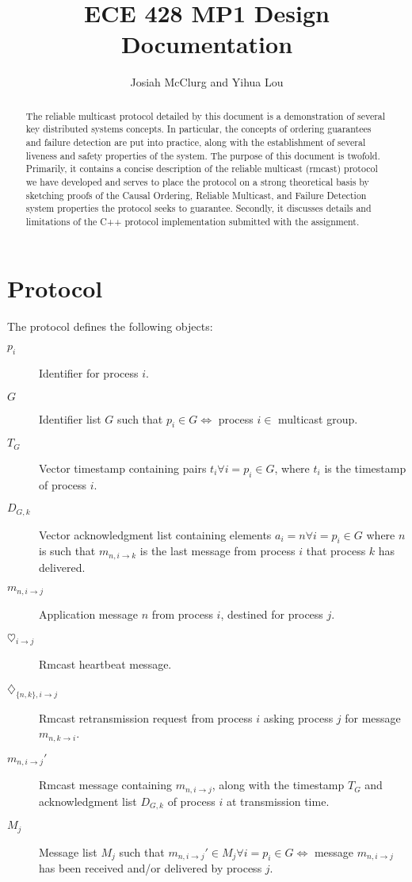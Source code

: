 \documentclass[conference]{IEEEtran}
\title{ECE 428 MP1 Design Documentation}
\author{Josiah McClurg and Yihua Lou}
\begin{document}
\maketitle

\begin{abstract}
The reliable multicast protocol detailed by this document is a demonstration of several key distributed systems concepts. In particular, the concepts of ordering guarantees and failure detection are put into practice, along with the establishment of several liveness and safety properties of the system.
The purpose of this document is twofold. Primarily, it contains a concise description of the reliable multicast (rmcast) protocol we have developed and serves to place the protocol on a strong theoretical basis by sketching proofs of the Causal Ordering, Reliable Multicast, and Failure Detection system properties the protocol seeks to guarantee. Secondly, it discusses details and limitations of the C++ protocol implementation submitted with the assignment.
\end{abstract}

\section{Protocol}

The protocol defines the following objects:
\begin{description}
\item[$p_i$] Identifier for process $i$.
\item[$G$] Identifier list $G$ such that $p_i \in G \iff $ process $i \in $ multicast group.
\item[$T_{G}$] Vector timestamp containing pairs $t_i \forall i=p_i \in G$, where $t_i$ is the timestamp of process $i$.
\item[$D_{G,k}$] Vector acknowledgment list containing elements $a_i = n \forall i=p_i \in G$ where $n$ is such that $m_{n, i\to k}$ is the last message from process $i$ that process $k$ has delivered.
\item[$m_{n,i \to j}$] Application message $n$ from process $i$, destined for process $j$.
\item[$\heartsuit_{i \to j}$] Rmcast heartbeat message.
\item[$\diamondsuit_{\{n,k\},i \to j}$] Rmcast retransmission request from process $i$ asking process $j$ for message $m_{n,k \to i}$.
\item[$m_{n,i \to j}'$] Rmcast message containing $m_{n,i\to j}$, along with the timestamp $T_G$ and acknowledgment list $D_{G,k}$ of process $i$ at transmission time.
\item[$M_j$] Message list $M_j$ such that $m_{n, i \to j}' \in M_j \forall i=p_i \in G \iff $ message $m_{n, i \to j}$ has been received and/or delivered by process $j$.
\end{description}
\end{document}
